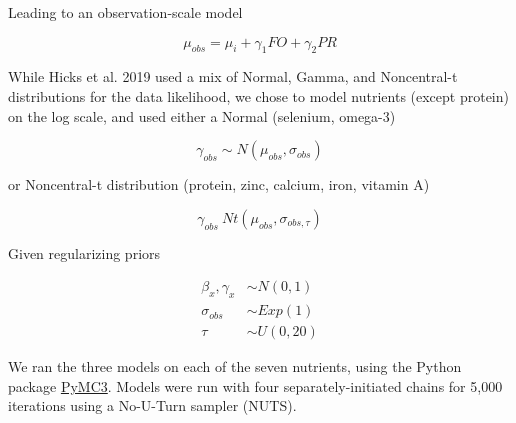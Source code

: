 \documentclass{article}
\begin{document}
Leading to an observation-scale model

\[
\mu_{obs} = \mu_i+\gamma_1 FO+\gamma_2 PR
\]

While Hicks et al. 2019 used a mix of Normal, Gamma, and Noncentral-t distributions for the data likelihood, we chose to model nutrients (except protein) on the log scale, and used either a Normal (selenium, omega-3) 

\[
\gamma_{obs} \sim N(\mu_{obs},\sigma_{obs})
\]

or Noncentral-t distribution (protein, zinc, calcium, iron, vitamin A)

\[
\gamma_{obs}~Nt(\mu_{obs},\sigma_{obs,\tau})
\]

Given regularizing priors

\begin{align*}
\beta_x, \gamma_x &\sim N(0,1) \\
\sigma_{obs} &\sim Exp(1)\\ 
\tau &\sim U(0,20)
\end{align*}

We ran the three models on each of the seven nutrients, using the Python package \href{https://docs.pymc.io/}{PyMC3}. Models were run with four separately-initiated chains for 5,000 iterations using a No-U-Turn sampler (NUTS). 
\end{document}
